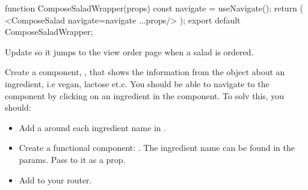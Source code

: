 \documentclass[fleqn, article, a4paper]{memoir}
\begin{document}
\begin{Assignments}
\begin{Code}
function ComposeSaladWrapper(props){
  const navigate = useNavigate();
  return (
    <ComposeSalad navigate={navigate} {...props}/>
  );
}
export default ComposeSaladWrapper;
\end{Code}
\noindent Update  so it jumps to the view order page when a salad is ordered.


\item Create a component, , that shows the information from the  object about an ingredient, i.e vegan, lactose et.c. You should be able to navigate to the  component by clicking on an ingredient in the  component. To solv this, you should:

\begin{itemize}
  \item Add a  around each ingredient name in .
  \item Create a functional component: . The ingredient name can be found in the params. Pass  to it as a prop.
  \item Add  to your router.
\end{itemize}


\end{Assignments}
\end{document}
